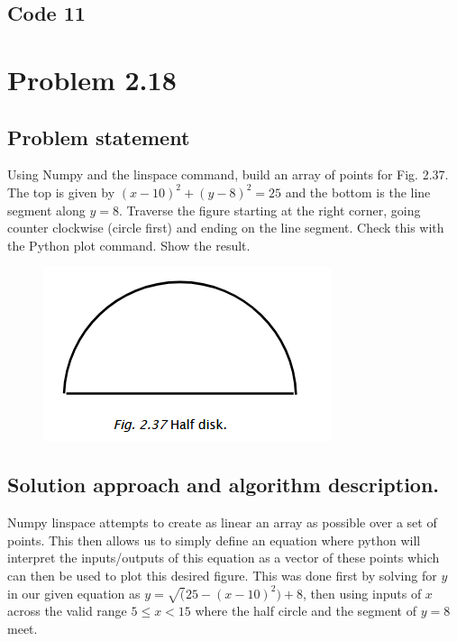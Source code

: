 \documentclass[letterpaper,11pt]{texMemo} %
\begin{document}
\newpage
\subsection*{Code 11}
\begin{tiny}

\end{tiny}

\newpage
\section*{Problem 2.18}
\subsection*{Problem statement}
Using Numpy and the linspace command, build an array of points for Fig. 2.37. The top is given by $(x-10)^2+(y-8)^2=25$
and the bottom is the line segment along $y=8$. Traverse the figure starting at the right corner, going counter clockwise
(circle first) and ending on the line segment. Check this with the Python plot command. Show the result.

\begin{figure}[h]
\centering
\includegraphics[scale=0.6]{img/fig237.png}
\end{figure}

\subsection*{Solution approach and algorithm description.}
Numpy linspace attempts to create as linear an array as possible over a set of points. This then allows us to simply define 
an equation where python will interpret the inputs/outputs of this equation as a vector of these points which can then be used
to plot this desired figure. This was done first by solving for $y$ in our given equation as $y=\sqrt(25-(x-10)^2)+8$, then using inputs of $x$ across the
valid range $5 \leq x < 15 $ where the half circle and the segment of $y=8$ meet.
\end{document}
